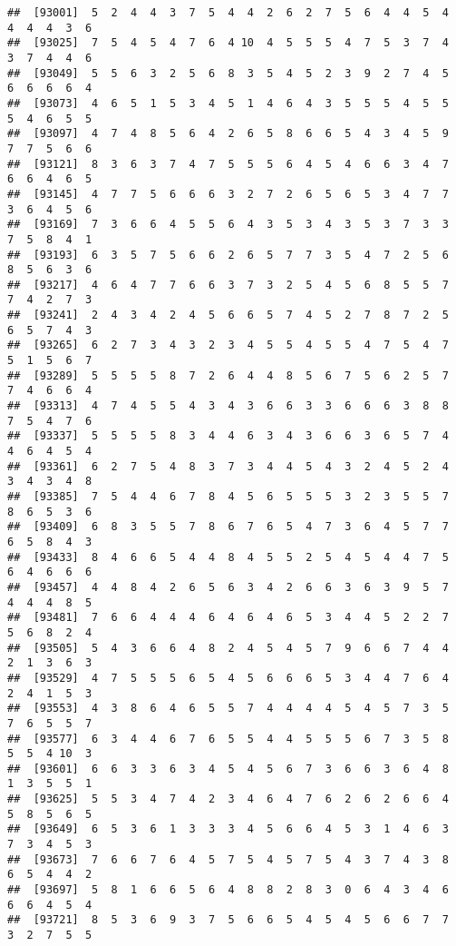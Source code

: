 \documentclass[
]{book}
\begin{document}
\begin{verbatim}
##  [93001]  5  2  4  4  3  7  5  4  4  2  6  2  7  5  6  4  4  5  4  4  4  4  3  6
##  [93025]  7  5  4  5  4  7  6  4 10  4  5  5  5  4  7  5  3  7  4  3  7  4  4  6
##  [93049]  5  5  6  3  2  5  6  8  3  5  4  5  2  3  9  2  7  4  5  6  6  6  6  4
##  [93073]  4  6  5  1  5  3  4  5  1  4  6  4  3  5  5  5  4  5  5  5  4  6  5  5
##  [93097]  4  7  4  8  5  6  4  2  6  5  8  6  6  5  4  3  4  5  9  7  7  5  6  6
##  [93121]  8  3  6  3  7  4  7  5  5  5  6  4  5  4  6  6  3  4  7  6  6  4  6  5
##  [93145]  4  7  7  5  6  6  6  3  2  7  2  6  5  6  5  3  4  7  7  3  6  4  5  6
##  [93169]  7  3  6  6  4  5  5  6  4  3  5  3  4  3  5  3  7  3  3  7  5  8  4  1
##  [93193]  6  3  5  7  5  6  6  2  6  5  7  7  3  5  4  7  2  5  6  8  5  6  3  6
##  [93217]  4  6  4  7  7  6  6  3  7  3  2  5  4  5  6  8  5  5  7  7  4  2  7  3
##  [93241]  2  4  3  4  2  4  5  6  6  5  7  4  5  2  7  8  7  2  5  6  5  7  4  3
##  [93265]  6  2  7  3  4  3  2  3  4  5  5  4  5  5  4  7  5  4  7  5  1  5  6  7
##  [93289]  5  5  5  5  8  7  2  6  4  4  8  5  6  7  5  6  2  5  7  7  4  6  6  4
##  [93313]  4  7  4  5  5  4  3  4  3  6  6  3  3  6  6  6  3  8  8  7  5  4  7  6
##  [93337]  5  5  5  5  8  3  4  4  6  3  4  3  6  6  3  6  5  7  4  4  6  4  5  4
##  [93361]  6  2  7  5  4  8  3  7  3  4  4  5  4  3  2  4  5  2  4  3  4  3  4  8
##  [93385]  7  5  4  4  6  7  8  4  5  6  5  5  5  3  2  3  5  5  7  8  6  5  3  6
##  [93409]  6  8  3  5  5  7  8  6  7  6  5  4  7  3  6  4  5  7  7  6  5  8  4  3
##  [93433]  8  4  6  6  5  4  4  8  4  5  5  2  5  4  5  4  4  7  5  6  4  6  6  6
##  [93457]  4  4  8  4  2  6  5  6  3  4  2  6  6  3  6  3  9  5  7  4  4  4  8  5
##  [93481]  7  6  6  4  4  4  6  4  6  4  6  5  3  4  4  5  2  2  7  5  6  8  2  4
##  [93505]  5  4  3  6  6  4  8  2  4  5  4  5  7  9  6  6  7  4  4  2  1  3  6  3
##  [93529]  4  7  5  5  5  6  5  4  5  6  6  6  5  3  4  4  7  6  4  2  4  1  5  3
##  [93553]  4  3  8  6  4  6  5  5  7  4  4  4  4  5  4  5  7  3  5  7  6  5  5  7
##  [93577]  6  3  4  4  6  7  6  5  5  4  4  5  5  5  6  7  3  5  8  5  5  4 10  3
##  [93601]  6  6  3  3  6  3  4  5  4  5  6  7  3  6  6  3  6  4  8  1  3  5  5  1
##  [93625]  5  5  3  4  7  4  2  3  4  6  4  7  6  2  6  2  6  6  4  5  8  5  6  5
##  [93649]  6  5  3  6  1  3  3  3  4  5  6  6  4  5  3  1  4  6  3  7  3  4  5  3
##  [93673]  7  6  6  7  6  4  5  7  5  4  5  7  5  4  3  7  4  3  8  6  5  4  4  2
##  [93697]  5  8  1  6  6  5  6  4  8  8  2  8  3  0  6  4  3  4  6  6  6  4  5  4
##  [93721]  8  5  3  6  9  3  7  5  6  6  5  4  5  4  5  6  6  7  7  3  2  7  5  5

\end{verbatim}
\end{document}
